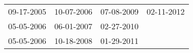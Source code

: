 \begin{supertabular}{llll}
 09-17-2005 &  10-07-2006 &  07-08-2009 &  02-11-2012 \\
 05-05-2006 &  06-01-2007 &  02-27-2010 &             \\
 05-05-2006 &  10-18-2008 &  01-29-2011 &             \\
\end{supertabular}
